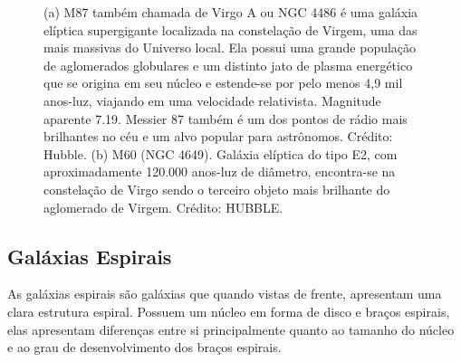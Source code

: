 \begin{figure}[ht!]
\centering 
{} 
\qquad 
{} 
\caption{(a) M87 também chamada de Virgo A ou NGC 4486 é uma galáxia elíptica supergigante localizada na constelação de Virgem, uma das mais massivas do Universo local. Ela possui uma grande população de aglomerados globulares e um distinto jato de plasma energético que se origina em seu núcleo e estende-se por pelo menos 4,9 mil anos-luz, viajando em uma velocidade relativista. Magnitude aparente 7.19. Messier 87 também é um dos pontos de rádio mais brilhantes no céu e um alvo popular para astrônomos. Crédito: Hubble. \newline  (b) M60 (NGC 4649). Galáxia elíptica do tipo E2, com aproximadamente 120.000 anos-luz de diâmetro, encontra-se na constelação de Virgo sendo o terceiro objeto mais brilhante do aglomerado de Virgem. Crédito: HUBBLE.} 
\label{fig:galáxiasElipticas2} 
\end{figure} 

\subsection{Galáxias Espirais} 

As galáxias espirais são galáxias que quando vistas de frente, apresentam uma clara estrutura espiral. Possuem um núcleo em forma de disco e braços espirais, elas apresentam diferenças entre si principalmente quanto ao tamanho do núcleo e ao grau de desenvolvimento dos braços espirais\cite{extragalatic}.  

